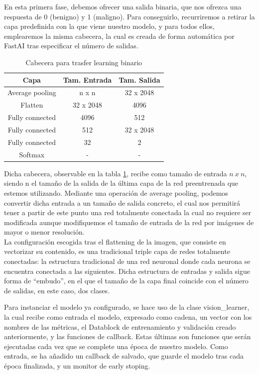 En esta primera fase, debemos ofrecer una salida binaria, que nos ofrezca una respuesta de 0 (benigno) y 1 (maligno). Para conseguirlo, recurriremos a retirar la capa predefinida con la que viene nuestro modelo, y para todos ellos, emplearemos la misma cabecera, la cual es creada de forma automática por FastAI tras especificar el número de salidas.

\begin{table}[H]
	\centering
	\begin{tabular}{|c|c|c|}
		\hline
		\textbf{Capa} & \textbf{Tam. Entrada} & \textbf{Tam. Salida} \\ \hline
		Average pooling & n x n & 32 x 2048 \\ \hline
		Flatten & 32 x 2048 & 4096 \\ \hline
		Fully connected & 4096 & 512 \\ \hline
		Fully connected & 512 & 32 x 2048 \\ \hline
		Fully connected & 32 & 2 \\ \hline
		Softmax & - & - \\ \hline
	\end{tabular}
		\caption{Cabecera para trasfer learning binario}
	\label{header}
\end{table}

Dicha cabecera, observable en la tabla \ref{header}, recibe como tamaño de entrada $n\ x\ n$, siendo n el tamaño de la salida de la última capa de la red preentrenada que estemos utilizando. Mediante una operación de average pooling, podemos convertir dicha entrada a un tamaño de salida concreto, el cual nos permitirá tener a partir de este punto una red totalmente conectada la cual no requiere ser modificada aunque modifiquemos el tamaño de entrada de la red por imágenes de mayor o menor resolución. \\

La configuración escogida tras el flattening de la imagen, que consiste en vectorizar su contenido, es una tradicional triple capa de redes totalmente conectadas: la estructura tradicional de una red neuronal donde cada neurona se encuentra conectada a las siguientes. Dicha estructura de entradas y salida sigue forma de ``embudo'', en el que el tamaño de la capa final coincide con el  número de salidas, en este caso, dos clases.

Para instanciar el modelo ya configurado, se hace uso de la clase vision\_learner, la cual recibe como entrada el modelo, expresado como cadena, un vector con los nombres de las métricas, el Datablock de entrenamiento y validación creado anteriormente, y las funciones de callback. Estas últimas son funciones que serán ejecutadas cada vez que se complete una época de nuestro modelo. Como entrada, se ha añadido un callback de salvado, que guarde el modelo tras cada época finalizada, y un monitor de early stoping.


